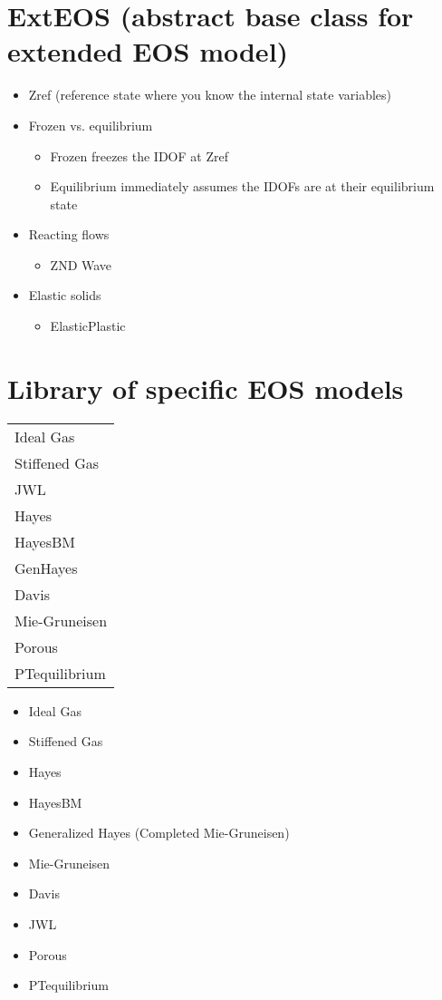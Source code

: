 \documentclass[twocolumn,10pt]{asme2ej}
\begin{document}
\section{ExtEOS (abstract base class for extended EOS model)}

\begin{itemize}
	\item Zref (reference state where you know the internal state variables)
	\item Frozen vs. equilibrium
		\begin{itemize}
			\item Frozen freezes the IDOF at Zref
			\item Equilibrium immediately assumes the IDOFs are at their equilibrium state
		\end{itemize}
\end{itemize}

\begin{itemize}
	\item Reacting flows
		\begin{itemize}
			\item ZND Wave
		\end{itemize}
	\item Elastic solids
		\begin{itemize}	
			\item ElasticPlastic
		\end{itemize}
\end{itemize}

\section{Library of specific EOS models}

\begin{tabular}[]{| l |}
\hline
Ideal Gas\\
Stiffened Gas\\
JWL\cite{RN746}\\
Hayes\cite{RN837}\\
HayesBM\\
GenHayes\\
Davis\cite{RN743}\\
Mie-Gruneisen\cite{RN824}\\
Porous\cite{RN837}\\
PTequilibrium\\
\hline
\end{tabular}

\begin{itemize}
	\item Ideal Gas
	\item Stiffened Gas
	\item Hayes
	\item HayesBM
	\item Generalized Hayes (Completed Mie-Gruneisen)
	\item Mie-Gruneisen
	\item Davis
	\item JWL 
	\item Porous
	\item PTequilibrium
\end{itemize}
\end{document}
